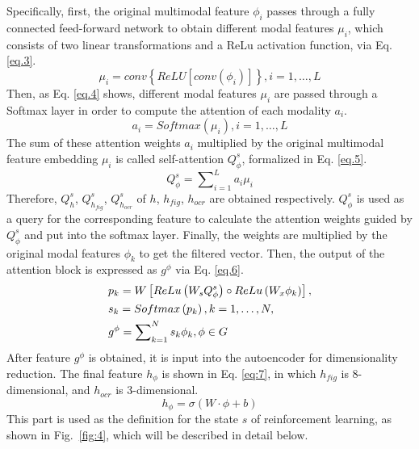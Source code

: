 \documentclass[10pt,journal,compsoc]{IEEEtran}
\begin{document}
Specifically, first, the original multimodal feature $\phi_i$ passes through a fully connected feed-forward network to obtain different modal features ${\mu _i}$, which consists of two linear transformations and a ReLu activation function, via Eq. \ref{eq.3}.
\begin{equation}\label{eq.3}
{\mu _i} = conv\left\{ {ReLU\left[ {conv\left( {{\phi _i}} \right)} \right]} \right\},i= 1, \ldots ,L
\end{equation}
Then, as Eq. \ref{eq.4} shows, different modal features ${\mu _i}$ are passed through a Softmax layer in order to compute the attention of each modality $a_i$. 
\begin{equation}\label{eq.4}
{a_i} = Softmax \left( {{\mu _i}} \right),i= 1, \ldots ,L
\end{equation}
The sum of these attention weights $a_i$ multiplied by the original multimodal feature embedding $\mu_i$ is called self-attention $Q_\phi ^s$, formalized in Eq. \ref{eq.5}.
\begin{equation}\label{eq.5}
Q_\phi ^s = \sum\nolimits_{i = 1}^L {{a_i}{\mu _i}}  
\end{equation}
Therefore, $Q^s_{h}$, $Q^s_{h_{fig}}$, $Q^s_{h_{ocr}}$ of $h$, $h_{fig}$, $h_{ocr }$ are obtained respectively. $Q_\phi ^s$ is used as a query for the corresponding feature to calculate the attention weights guided by $Q_\phi ^s$ and put into the softmax layer. Finally, the weights are multiplied by the original modal features $\phi_k$ to get the filtered vector. Then, the output of the attention block is expressed as $g^\phi$ via Eq. \ref{eq.6}.
\begin{equation}\label{eq.6}
\begin{gathered}
  {p_k} = W\left[ {ReLu\left( {{W_s}Q_\phi^s} \right) \circ ReLu\left( {{W_x}\phi _k} \right)} \right], \hfill \\
  {s_k} = Softmax \left( {{p_k}} \right),k = 1, \ldots ,N, \hfill \\
  {g^\phi} = \sum\nolimits_{k = 1}^N {{s_k}\phi _k,\phi \in G}  \hfill \\ 
\end{gathered} 
\end{equation}
After feature $g^\phi$ is obtained, it is input into the autoencoder for dimensionality reduction. The final feature $h_\phi$ is shown in Eq. \ref{eq:7}, in which $h_{fig}$ is 8-dimensional, and $h_{ocr}$ is 3-dimensional.
\begin{equation}\label{eq:7}
{h_\phi } = \sigma \left( {W \cdot \phi  + b} \right)
\end{equation}
This part is used as the definition for the state $s$ of reinforcement learning, as shown in Fig.~\ref{fig:4}, which will be described in detail below.\par
\end{document}
